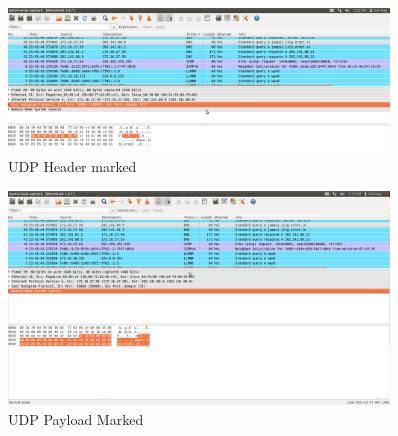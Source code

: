 \documentclass[a4,11pt]{article}
\begin{document}
    \begin{figure}[h!tb]
        \includegraphics[width=0.9\textwidth]{full-udp-header.png}
          \caption{UDP Header marked} 
          \label{fig:udp_header}
   \end{figure}
   
    \begin{figure}[h!tb]
        \includegraphics[width=0.9\textwidth]{udp-payload-marked.png}
         \caption{UDP Payload Marked}
         \label{fig:udp_payload}
  \end{figure}
  \pagebreak
\end{document}
